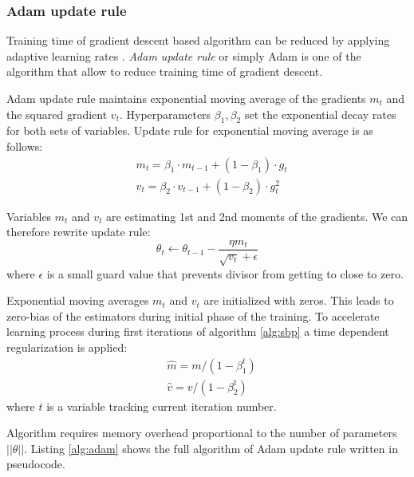 \subsubsection{Adam update rule}

Training time of gradient descent based algorithm can be reduced by applying adaptive learning rates \cite{Kingma2015}.
\textit{Adam update rule} or simply Adam is one of the algorithm that allow to reduce training time of gradient descent.

Adam update rule maintains exponential moving average of the gradients $m_t$ and the squared gradient $v_t$.
Hyperparameters $\beta_1, \beta_2$ set the exponential decay rates for both sets of variables.
Update rule for exponential moving average is as follows:
\begin{equation*}
  \begin{aligned}
    & m_t = \beta_1 \cdot m_{t-1} + (1-\beta_1) \cdot g_t \\
    & v_t = \beta_2 \cdot v_{t-1} + (1-\beta_2) \cdot g_t^2
  \end{aligned}
\end{equation*}

Variables $m_t$ and $v_t$ are estimating 1st and 2nd moments of the gradients.
We can therefore rewrite update rule:
\begin{equation}
  \theta_t \gets \theta_{t-1} - \frac{\eta m_t}{\sqrt{v_t} + \epsilon}
\end{equation}
where $\epsilon$ is a small guard value that prevents divisor from getting to close to zero.

Exponential moving averages $m_t$ and $v_t$ are initialized with zeros.
This leads to zero-bias of the estimators during initial phase of the training.
To accelerate learning process during first iterations of algorithm \ref{alg:sbp} a time dependent regularization is applied:
\begin{equation*}
  \begin{aligned}
    & \hat{m} = m / (1-\beta_1^t) \\
    & \hat{v} = v/(1-\beta_2^t)
  \end{aligned}
\end{equation*}
where $t$ is a variable tracking current iteration number.

Algorithm requires memory overhead proportional to the number of parameters $||\theta||$. Listing \ref{alg:adam} shows the full algorithm of Adam update rule written in pseudocode.



